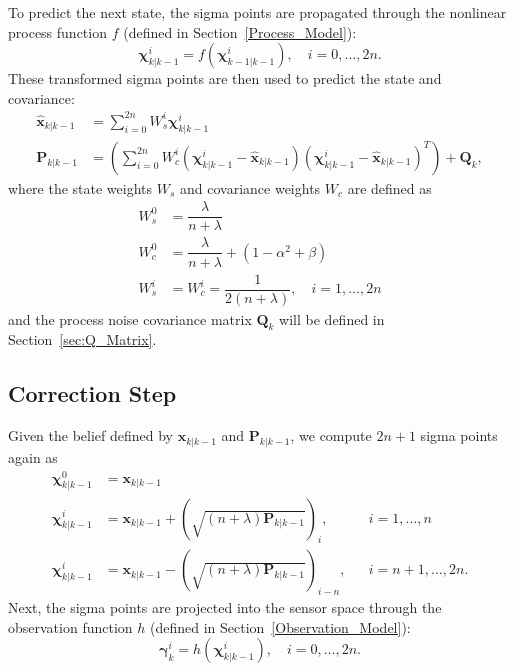 To predict the next state, the sigma points are propagated through the nonlinear process function $f$ (defined in Section~\ref{Process_Model}):
%
\begin{equation}
\bm{\chi}^{i}_{k | k-1} = f \left( \bm{\chi}^{i}_{k-1 | k-1} \right), \quad i = 0, \dots, 2n.
\end{equation}
%
These transformed sigma points are then used to predict the state and covariance:
%
\begin{align}
\hat{\mathbf{x}}_{k | k-1} &= \sum^{2n}_{i=0} W^{i}_{s} \bm{\chi}^{i}_{k | k-1} \\
\mathbf{P}_{k | k-1} &= \left( \sum^{2n}_{i=0} W^{i}_{c} \left( \bm{\chi}^{i}_{k | k-1} - \hat{\mathbf{x}}_{k | k-1} \right) \left( \bm{\chi}^{i}_{k | k-1} - \hat{\mathbf{x}}_{k | k-1} \right)^{T} \right) + \mathbf{Q}_{k},
\end{align}
%
where the state weights $W_{s}$ and covariance weights $W_{c}$ are defined as
%
\begin{align}
W^{0}_{s} &= \dfrac{\lambda}{n + \lambda} \nonumber \\
W^{0}_{c} &= \dfrac{\lambda}{n + \lambda} + \left( 1 - \alpha^{2} + \beta \right) \\
W^{i}_{s} &= W^{i}_{c} = \dfrac{1}{2 \left(n + \lambda \right)}, \quad i = 1, \dots, 2n \nonumber
\end{align}
%
and the process noise covariance matrix $\mathbf{Q}_{k}$ will be defined in Section~\ref{sec:Q_Matrix}.


\subsection{Correction Step}

Given the belief defined by $\mathbf{x}_{k | k-1}$ and $\mathbf{P}_{k | k-1}$, we compute $2n + 1$ sigma points again as
%
\begin{align}
\bm{\chi}^{0}_{k | k-1} &= \mathbf{x}_{k | k-1} & \nonumber\\
\bm{\chi}^{i}_{k | k-1} &= \mathbf{x}_{k | k-1} + \left( \sqrt{\left( n + \lambda \right) \mathbf{P}_{k | k-1}} \right)_{i}, &&i = 1, \dots, n \\
\bm{\chi}^{i}_{k | k-1} &= \mathbf{x}_{k | k-1} - \left( \sqrt{\left( n + \lambda \right) \mathbf{P}_{k | k-1}} \right)_{i-n}, &&i = n+1, \dots, 2n. \nonumber
\end{align}
%
Next, the sigma points are projected into the sensor space through the observation function $h$ (defined in Section~\ref{Observation_Model}):
%
\begin{equation}
\bm{\gamma}^{i}_{k} = h \left( \bm{\chi}^{i}_{k | k-1} \right), \quad i = 0, \dots, 2n.
\end{equation}


